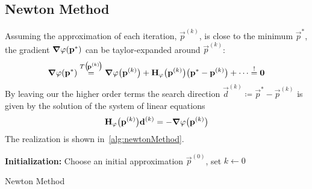 		\subsection{Newton Method}
			Assuming the approximation of each iteration, \( \vec{p}^{(k)} \), is close to the minimum \( \vec{p}^\ast \), the gradient \( \grad{\varphi}(\boldsymbol{\mathrm{p}}^\ast) \) can be taylor-expanded around \( \vec{p}^{(k)} \):
			\begin{align*}
				\grad{\varphi}(\boldsymbol{\mathrm{p}}^\ast) \overset{T\big(\!\boldsymbol{\mathrm{p}}^{(k)}\!\big)}{=} \grad{\varphi}\big(\boldsymbol{\mathrm{p}}^{(k)}\big) + \boldsymbol{\mathrm{H}}_\varphi\big(\boldsymbol{\mathrm{p}}^{(k)}\big) \big( \boldsymbol{\mathrm{p}}^\ast - \boldsymbol{\mathrm{p}}^{(k)} \big) + \cdots \overset{!}{=} \boldsymbol{\mathrm{0}}
			\end{align*}
			By leaving our the higher order terms the search direction \( \vec{d}^{(k)} \coloneqq \vec{p}^\ast - \vec{p}^{(k)} \) is given by the solution of the system of linear equations
			\begin{align*}
				\boldsymbol{\mathrm{H}}_\varphi\big(\boldsymbol{\mathrm{p}}^{(k)}\big) \boldsymbol{\mathrm{d}}^{(k)} = -\grad{\varphi}\big(\boldsymbol{\mathrm{p}}^{(k)}\big)
			\end{align*}
			The realization is shown in~\autoref{alg:newtonMethod}.
			
			\begin{algorithm}  \DontPrintSemicolon
				\textbf{Initialization:} Choose an initial approximation \(\vec{p}^{(0)}\), set \( k \gets 0 \) \;
				
				\caption{Newton Method}
				\label{alg:newtonMethod}
			\end{algorithm}
		
